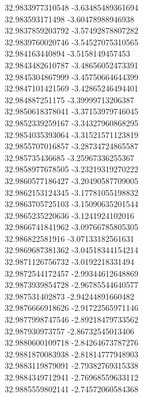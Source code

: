 {32.9833977310548	-3.63485489361694\\
32.983593171498	-3.60478988946938\\
32.9837859203792	-3.57492878807282\\
32.9839760020746	-3.54527075310565\\
32.984163440894	-3.5158149457453\\
32.9843482610787	-3.48656052473391\\
32.9845304867999	-3.45750664644399\\
32.9847101421569	-3.42865246494401\\
32.984887251175	-3.39999713206387\\
32.9850618378041	-3.37153979746045\\
32.9852339259167	-3.34327960868295\\
32.9854035393064	-3.31521571123819\\
32.9855707016857	-3.28734724865587\\
32.985735436685	-3.25967336255367\\
32.9858977678505	-3.23219319270222\\
32.9860577186427	-3.20490587709005\\
32.9862153124345	-3.17781055198832\\
32.9863705725103	-3.15090635201544\\
32.9865235220636	-3.1241924102016\\
32.9866741841962	-3.09766785805305\\
32.986822581916	-3.07133182561631\\
32.9869687381362	-3.04518344154214\\
32.9871126756732	-3.0192218331494\\
32.9872544172457	-2.99344612648869\\
32.9873939854728	-2.96785544640577\\
32.987531402873	-2.94244891660482\\
32.9876666918626	-2.91722565971146\\
32.9877998747546	-2.89218479733562\\
32.987930973757	-2.86732545013406\\
32.9880600109718	-2.84264673787276\\
32.9881870083938	-2.81814777948903\\
32.9883119879091	-2.79382769315338\\
32.9884349712941	-2.76968559633112\\
32.9885559802141	-2.74572060584368\\
}
